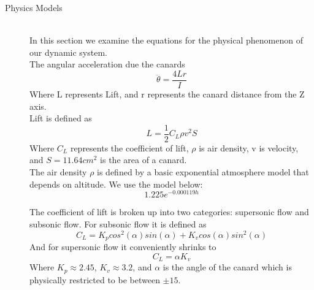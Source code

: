 \documentclass[12pt]{article}
\begin{document}
\begin{description}
	\item[Physics Models] \hfill \\
	In this section we examine the equations for the physical phenomenon of our dynamic system.\\
	
	The angular acceleration due the canards
	\begin{equation}
		\ddot{\theta} = \frac{4Lr}{I}
	\end{equation}
	Where L represents Lift, and r represents the canard distance from the Z axis.\\
	
	Lift is defined as
	\begin{equation}
		L = \frac{1}{2}C_{L}\rho v^2 S
	\end{equation}
	Where $C_{L}$ represents the coefficient of lift, $\rho$ is air density, v is velocity, and $S = 11.64cm^2$ is the area of a canard.\\
	
	The air density $\rho$ is defined by a basic exponential atmosphere model that depends on altitude. We use the model below:
	\begin{equation}
		1.225e^{-0.000119h}
	\end{equation}
	
	The coefficient of lift is broken up into two categories: supersonic flow and subsonic flow. For subsonic flow it is defined as
	\begin{equation}
		C_{L} = K_{p} cos^2(\alpha) sin(\alpha) + K_{v} cos(\alpha) sin^2(\alpha)
	\end{equation}
	And for supersonic flow it conveniently shrinks to
	\begin{equation}
		C_{L} = \alpha K_{v}
	\end{equation}
	Where $K_{p} \approx 2.45$, $K_{v} \approx 3.2$, and $\alpha$ is the angle of the canard which is physically restricted to be between $\pm15$\textdegree.
	
\end{description}
 
\end{document}
